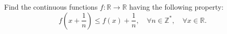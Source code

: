 Find the continuous functions $ f:\mathbb{R}\longrightarrow\mathbb{R} $ having the following property:
$$ f\left( x+\frac{1}{n}\right) \le f(x) +\frac{1}{n},\quad\forall n\in\mathbb{Z}^* ,\quad\forall x\in\mathbb{R} . $$